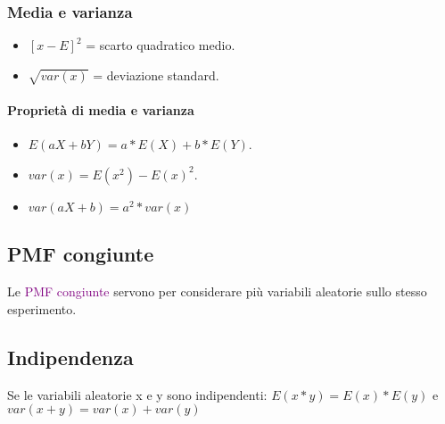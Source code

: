 \subsubsection{Media e varianza}





\begin{itemize}
    \item $[x - E]^2$ = scarto quadratico medio.
    \item $\sqrt{var(x)}$ = deviazione standard.
\end{itemize}

\paragraph{Proprietà di media e varianza}

\begin{itemize}
    \item $E(aX + bY) = a * E(X) + b * E(Y)$.
    \item $var(x) = E(x^2) - E(x)^2$.
    \item $var(aX + b) = a^2 * var(x)$
\end{itemize}

\subsection{PMF congiunte}

Le \textcolor{purple}{PMF congiunte} servono per considerare più variabili aleatorie sullo stesso esperimento.


\subsection{Indipendenza}

Se le variabili aleatorie x e y sono indipendenti: $E(x * y) = E(x) * E(y)$ e $var(x + y) = var (x) + var(y)$

